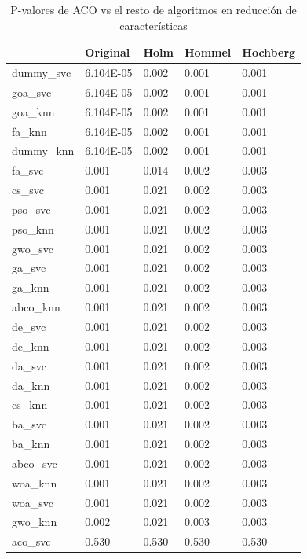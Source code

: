 \begin{table}[htb]
    \centering
    \begin{tabular}{lllll}
        \toprule
        {}         & Original  & Holm  & Hommel & Hochberg \\
        \midrule
        dummy\_svc & 6.104E-05 & 0.002 & 0.001  & 0.001    \\
        goa\_svc   & 6.104E-05 & 0.002 & 0.001  & 0.001    \\
        goa\_knn   & 6.104E-05 & 0.002 & 0.001  & 0.001    \\
        fa\_knn    & 6.104E-05 & 0.002 & 0.001  & 0.001    \\
        dummy\_knn & 6.104E-05 & 0.002 & 0.001  & 0.001    \\
        fa\_svc    & 0.001     & 0.014 & 0.002  & 0.003    \\
        cs\_svc    & 0.001     & 0.021 & 0.002  & 0.003    \\
        pso\_svc   & 0.001     & 0.021 & 0.002  & 0.003    \\
        pso\_knn   & 0.001     & 0.021 & 0.002  & 0.003    \\
        gwo\_svc   & 0.001     & 0.021 & 0.002  & 0.003    \\
        ga\_svc    & 0.001     & 0.021 & 0.002  & 0.003    \\
        ga\_knn    & 0.001     & 0.021 & 0.002  & 0.003    \\
        abco\_knn  & 0.001     & 0.021 & 0.002  & 0.003    \\
        de\_svc    & 0.001     & 0.021 & 0.002  & 0.003    \\
        de\_knn    & 0.001     & 0.021 & 0.002  & 0.003    \\
        da\_svc    & 0.001     & 0.021 & 0.002  & 0.003    \\
        da\_knn    & 0.001     & 0.021 & 0.002  & 0.003    \\
        cs\_knn    & 0.001     & 0.021 & 0.002  & 0.003    \\
        ba\_svc    & 0.001     & 0.021 & 0.002  & 0.003    \\
        ba\_knn    & 0.001     & 0.021 & 0.002  & 0.003    \\
        abco\_svc  & 0.001     & 0.021 & 0.002  & 0.003    \\
        woa\_knn   & 0.001     & 0.021 & 0.002  & 0.003    \\
        woa\_svc   & 0.001     & 0.021 & 0.002  & 0.003    \\
        gwo\_knn   & 0.002     & 0.021 & 0.003  & 0.003    \\
        aco\_svc   & 0.530     & 0.530 & 0.530  & 0.530    \\
        \bottomrule
    \end{tabular}
    \caption{P-valores de ACO vs el resto de algoritmos en reducción de características}
    \label{tab:p-values_aco_rest}
\end{table}


